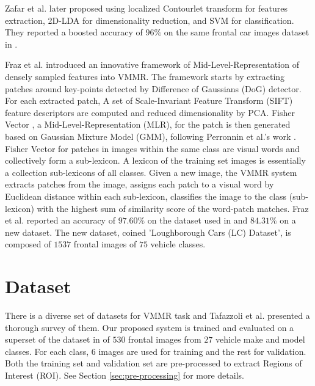 Zafar et al. \citep{zafar2009localized} later proposed using localized Contourlet transform for features extraction, 2D-LDA for dimensionality reduction, and SVM for classification.
They reported a boosted accuracy of $96\%$ on the same frontal car images dataset in \citep{zafar2007two}.


Fraz et al. \citep{fraz2014mid} introduced an innovative framework of Mid-Level-Representation of densely sampled features into VMMR.
The framework starts by extracting patches around key-points detected by Difference of Gaussians (DoG) detector.
For each extracted patch, A set of Scale-Invariant Feature Transform (SIFT) \citep{lowe2004distinctive} feature descriptors are computed and reduced dimensionality by PCA.
Fisher Vector \citep{jaakkola1999exploiting}, a Mid-Level-Representation (MLR), for the patch is then generated based on Gaussian Mixture Model (GMM), following Perronnin et al.'s work \citep{perronnin2010improving}.
Fisher Vector for patches in images within the same class are visual words and collectively form a sub-lexicon.
A lexicon of the training set images is essentially a collection sub-lexicons of all classes.
Given a new image, the VMMR system 
extracts patches from the image, 
assigns each patch to a visual word by Euclidean distance within each sub-lexicon, 
classifies the image to the class (sub-lexicon) with the highest sum of similarity score of the word-patch matches.
Fraz et al. reported an accuracy of $97.60\%$ on the dataset used in \citep{zafar2009localized} and $84.31\%$ on a new dataset. The new dataset, coined 'Loughborough Cars (LC) Dataset', is composed of $1537$ frontal images of $75$ vehicle classes.


\section{Dataset}
\label{sec:dataset}
There is a diverse set of datasets for VMMR task and Tafazzoli et al. \citep{tafazzoli2017large} presented a thorough survey of them.
Our proposed system is trained and evaluated on a superset of the dataset in \citep{zafar2007two,zafar2009localized,fraz2014mid} of $530$ frontal images from $27$ vehicle make and model classes.
For each class, $6$ images are used for training and the rest for validation.
Both the training set and validation set are pre-processed to extract Regions of Interest (ROI). See Section \ref{sec:pre-processing} for more details.

